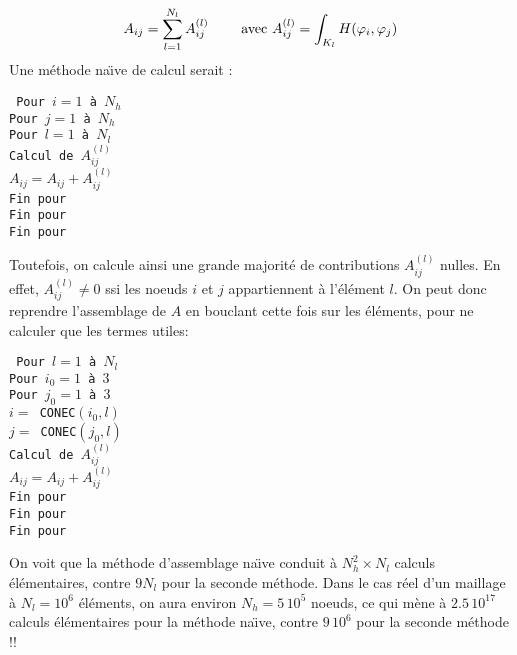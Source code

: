 $$
A_{ij} = \sum_{l=1}^{N_l} A_{ij}^{(l)} \qquad\hbox{ avec } A_{ij}^{(l)}= \int_{K_l} H(\varphi_i,\varphi_j)
$$
%
Une m\'ethode na\"{\i}ve de calcul serait :
\begin{center}
\begin{minipage}{10 cm}
{\tt 
Pour $i=1$ \`a $N_h$\\
Pour $j=1$ \`a $N_h$\\
\hspace*{5 mm}Pour $l=1$ \`a $N_l$\\
\hspace*{10 mm}Calcul de $A_{ij}^{(l)}$\\
\hspace*{10 mm}$A_{ij}=A_{ij}+A_{ij}^{(l)}$\\
\hspace*{5 mm}Fin pour\\
Fin pour\\
Fin pour
}\\
\end{minipage}
\end{center}
%
%
Toutefois, on calcule ainsi une grande majorit\'e de contributions $A_{ij}^{(l)}$ nulles. En effet, $A_{ij}^{(l)}\ne 0$ ssi les noeuds $i$ et $j$ appartiennent \`a l'\'el\'ement $l$. On peut donc reprendre l'assemblage de $A$
en bouclant cette fois sur les \'el\'ements, pour ne calculer que les termes utiles:
%
\begin{center}
\begin{minipage}{10 cm}
{\tt 
Pour $l=1$ \`a $N_l$\\
\hspace*{5 mm}Pour $i_0=1$ \`a $3$\\
\hspace*{5 mm}Pour $j_0=1$ \`a $3$\\
\hspace*{10 mm}$i=$ CONEC$(i_0,l)$\\
\hspace*{10 mm}$j=$ CONEC$(j_0,l)$\\
\hspace*{10 mm}Calcul de $A_{ij}^{(l)}$\\
\hspace*{10 mm}$A_{ij}=A_{ij}+A_{ij}^{(l)}$\\
\hspace*{5 mm}Fin pour\\
\hspace*{5 mm}Fin pour\\
Fin pour
}\\
\end{minipage}
\end{center}
%
%
On voit que la m\'ethode d'assemblage na\"{\i}ve conduit \`a $N_h^2\times N_l$ calculs \'el\'ementaires, contre $9 N_l$ pour la seconde m\'ethode. Dans le cas r\'eel d'un maillage \`a $N_l=10^6$ \'el\'ements, on aura environ $N_h=5\, 10^5$ noeuds, ce qui m\`ene \`a $2.5\, 10^{17}$ calculs \'el\'ementaires pour la m\'ethode na\"{\i}ve, contre $9\, 10^6$ pour la seconde m\'ethode !!
%
%
